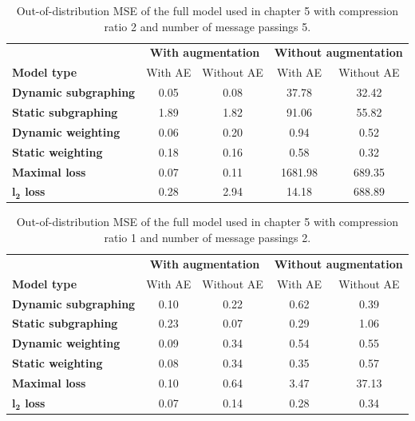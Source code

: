 \documentclass[12pt,a4paper]{report}
\begin{document}
\begin{appendices}
\begin{table}
\centering
\caption{Out-of-distribution MSE of the full model used in chapter 5 with compression ratio 2 and number of message passings 5.}
\label{table_2_5}
\begin{tabular}{lcccc}
\toprule
 & \multicolumn{2}{c}{\textbf{With augmentation}} & \multicolumn{2}{c}{\textbf{Without augmentation}} \\
 \cmidrule{2-3} \cmidrule{4-5}
\textbf{Model type} & With AE & Without AE & With AE & Without AE \\
\midrule
\textbf{Dynamic subgraphing} & 0.05 & 0.08 & 37.78 & 32.42 \\
\textbf{Static subgraphing} & 1.89 & 1.82 & 91.06 & 55.82 \\
\textbf{Dynamic weighting} & 0.06 & 0.20 & 0.94 & 0.52 \\
\textbf{Static weighting} & 0.18 & 0.16 & 0.58 & 0.32 \\
\textbf{Maximal loss} & 0.07 & 0.11 & 1681.98 & 689.35 \\
\textbf{$\boldsymbol{l_2}$ loss} & 0.28 & 2.94 & 14.18 & 688.89 \\
\bottomrule
\end{tabular}
\end{table}

\begin{table}
\centering
\caption{Out-of-distribution MSE of the full model used in chapter 5 with compression ratio 1 and number of message passings 2.}
\label{table_1_2}
\begin{tabular}{lcccc}
\toprule
 & \multicolumn{2}{c}{\textbf{With augmentation}} & \multicolumn{2}{c}{\textbf{Without augmentation}} \\
 \cmidrule{2-3} \cmidrule{4-5}
\textbf{Model type} & With AE & Without AE & With AE & Without AE \\
\midrule
\textbf{Dynamic subgraphing} & 0.10 & 0.22 & 0.62 & 0.39 \\
\textbf{Static subgraphing} & 0.23 & 0.07 & 0.29 & 1.06 \\
\textbf{Dynamic weighting} & 0.09 & 0.34 & 0.54 & 0.55 \\
\textbf{Static weighting} & 0.08 & 0.34 & 0.35 & 0.57 \\
\textbf{Maximal loss} & 0.10 & 0.64 & 3.47 & 37.13 \\
\textbf{$\boldsymbol{l_2}$ loss} & 0.07 & 0.14 & 0.28 & 0.34 \\
\bottomrule
\end{tabular}
\end{table}


\end{appendices}
\end{document}
